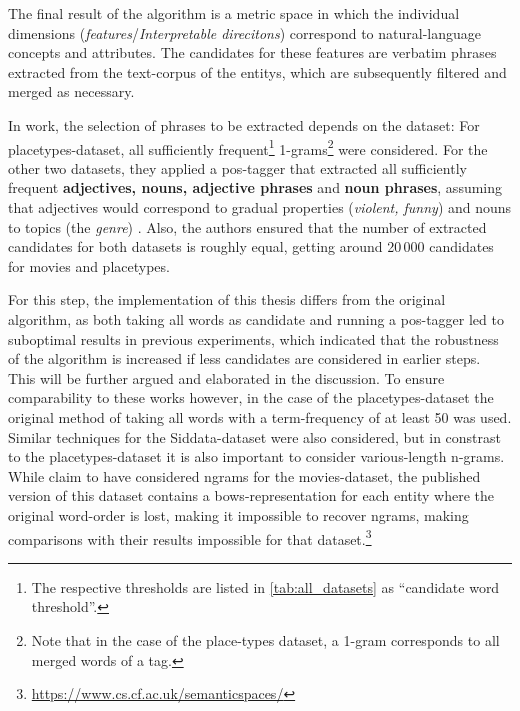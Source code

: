 The final result of the algorithm is a metric space in which the individual dimensions (\emph{\glspl{feature}}/\emph{Interpretable direcitons}) correspond to natural-language concepts and attributes. The candidates for these features are verbatim phrases extracted from the text-corpus of the \glspl{entity}, which are subsequently filtered and merged as necessary.

In  work, the selection of phrases to be extracted depends on the dataset: For placetypes-dataset, all sufficiently frequent\footnote{\label{fnote:cand_thresholds}The respective thresholds are listed in \autoref{tab:all_datasets} as ``candidate word threshold''.} 1-grams\footnote{Note that in the case of the place-types dataset, a 1-gram corresponds to all merged words of a tag.} were considered. For the other two datasets, they applied a \gls{pos}-tagger that extracted all sufficiently frequent \textbf{adjectives, nouns, adjective phrases} and \textbf{noun phrases}, assuming that adjectives would correspond to gradual properties (\eg \textit{violent, funny}) and nouns to topics (\eg the \textit{genre}) \cite[Sec. 4.2.1]{Derrac2015}. Also, the authors ensured that the number of extracted candidates for both datasets is roughly equal, getting around 20\,000 candidates for movies and placetypes.

For this step, the implementation of this thesis differs from the original algorithm, as both taking all words as candidate and running a \gls{pos}-tagger led to suboptimal results in previous experiments, which indicated that the robustness of the algorithm is increased if less candidates are considered in earlier steps. This will be further argued and elaborated in the discussion. To ensure comparability to these works however, in the case of the placetypes-dataset the original method of taking all words with a term-frequency of at least 50 was used. Similar techniques for the Siddata-dataset were also considered, but in constrast to the placetypes-dataset it is also important to consider various-length n-grams. While \textcite{Derrac2015} claim to have considered \glspl{ngram} for the movies-dataset, the published version of this dataset contains a \glspl{bow}-representation for each entity where the original word-order is lost, making it impossible to recover \glspl{ngram}, making comparisons with their results impossible for that dataset.\footnote{\url{https://www.cs.cf.ac.uk/semanticspaces/}}

